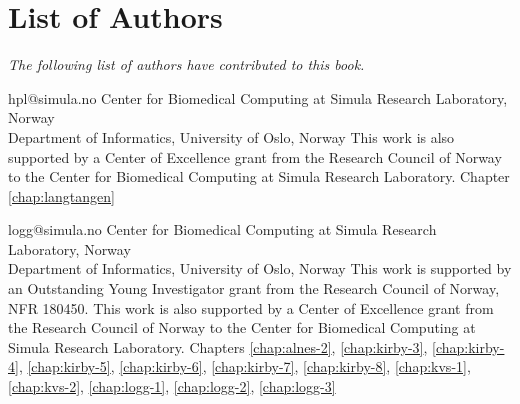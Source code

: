 \chapter*{List of Authors}

\emph{The following list of authors have contributed to this book.}

\vspace{1cm}













             {hpl@simula.no}
             {Center for Biomedical Computing at Simula Research Laboratory, Norway \\
              Department of Informatics, University of Oslo, Norway}
             {This work is also supported by a Center of Excellence
              grant from the Research Council of Norway to the Center
              for Biomedical Computing at Simula Research
              Laboratory.}
             {Chapter \ref{chap:langtangen}}



             {logg@simula.no}
             {Center for Biomedical Computing at Simula Research Laboratory, Norway \\
              Department of Informatics, University of Oslo, Norway}
             {This work is supported by an Outstanding Young
              Investigator grant from the Research Council of Norway,
              NFR 180450. This work is also supported by a Center of
              Excellence grant from the Research Council of Norway to
              the Center for Biomedical Computing at Simula Research
              Laboratory.}
             {Chapters
              \ref{chap:alnes-2}, \ref{chap:kirby-3}, \ref{chap:kirby-4},
              \ref{chap:kirby-5}, \ref{chap:kirby-6}, \ref{chap:kirby-7},
              \ref{chap:kirby-8}, \ref{chap:kvs-1}, \ref{chap:kvs-2},
              \ref{chap:logg-1}, \ref{chap:logg-2}, \ref{chap:logg-3}}

